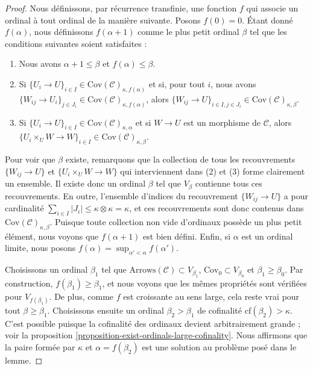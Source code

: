\begin{proof}
\medskip\noindent
Nous définissons, par récurrence transfinie, une fonction $f$ qui associe un
ordinal à tout ordinal de la manière suivante. Posons $f(0) = 0$.
Étant donné $f(\alpha)$, nous définissons $f(\alpha + 1)$ comme le plus petit
ordinal $\beta$ tel que les conditions suivantes soient satisfaites :
\begin{enumerate}
\item Nous avons $\alpha + 1 \leq \beta$ et $f(\alpha) \leq \beta$.
\item Si $\{U_i \to U\}_{i\in I}
\in \text{Cov}(\mathcal{C})_{\kappa, f(\alpha)}$ et si, pour tout $i$, nous
avons
$\{W_{ij} \to U_i\}_{j\in J_i}
\in \text{Cov}(\mathcal{C})_{\kappa, f(\alpha)}$,
alors
$\{W_{ij} \to U\}_{i \in I, j\in J_i}
\in \text{Cov}(\mathcal{C})_{\kappa, \beta}$.
\item Si $\{U_i \to U\}_{i\in I}
\in \text{Cov}(\mathcal{C})_{\kappa, \alpha}$ et si $W \to U$ est un
morphisme de $\mathcal{C}$, alors
$\{U_i \times_U W \to W \}_{i\in I}
\in \text{Cov}(\mathcal{C})_{\kappa, \beta}$.
\end{enumerate}
Pour voir que $\beta$ existe, remarquons que la collection de tous les
recouvrements $\{W_{ij} \to U\}$ et $\{U_i \times_U W \to W \}$ qui
interviennent dans (2) et (3) forme clairement un ensemble. Il existe donc un
ordinal $\beta$ tel que $V_\beta$ contienne tous ces recouvrements. En outre,
l'ensemble d'indices du recouvrement $\{W_{ij} \to U\}$ a pour cardinalité
$\sum_{i \in I} |J_i| \leq \kappa \otimes \kappa = \kappa$, et ces
recouvrements sont donc contenus dans
$\text{Cov}(\mathcal{C})_{\kappa, \beta}$.
Puisque toute collection non vide d'ordinaux possède un plus petit élément,
nous voyons que $f(\alpha + 1)$ est bien défini. Enfin, si $\alpha$ est un
ordinal limite, nous posons
$f(\alpha) = \sup_{\alpha' < \alpha} f(\alpha')$.

\medskip\noindent
Choisissons un ordinal $\beta_1$ tel que
$\text{Arrows}(\mathcal{C}) \subset V_{\beta_1}$,
$\text{Cov}_0 \subset V_{\beta_0}$ et $\beta_1 \geq \beta_0$.
Par construction, $f(\beta_1) \geq \beta_1$, et nous voyons que les mêmes
propriétés sont vérifiées pour $V_{f(\beta_1)}$. De plus, comme $f$ est
croissante au sens large, cela reste vrai pour tout $\beta \geq \beta_1$.
Choisissons ensuite un ordinal $\beta_2 > \beta_1$ de cofinalité
$\text{cf}(\beta_2) > \kappa$. C'est possible puisque la cofinalité des
ordinaux devient arbitrairement grande ; voir la
proposition \ref{proposition-exist-ordinals-large-cofinality}.
Nous affirmons que la paire formée par $\kappa$ et $\alpha = f(\beta_2)$ est
une solution au problème posé dans le lemme.


\end{proof}
